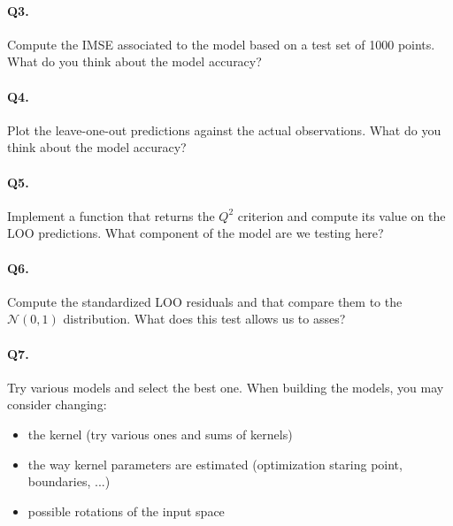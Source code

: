 \documentclass[12pt]{scrartcl}
\begin{document}
\paragraph{Q3.}
Compute the IMSE associated to the model based on a test set of 1000 points. What do you think about the model accuracy?

\paragraph{Q4.}
Plot the leave-one-out predictions against the actual observations. What do you think about the model accuracy?

\paragraph{Q5.}
Implement a function that returns the $Q^2$ criterion and compute its value on the LOO predictions. What component of the model are we testing here?

\paragraph{Q6.}
Compute the standardized LOO residuals and that compare them to the $\mathcal{N}(0,1)$ distribution. What does this test allows us to asses?

\paragraph{Q7.} Try various models and select the best one. When building the models, you may consider changing:
\begin{itemize}
   	\item the kernel (try various ones and sums of kernels)
   	\item the way kernel parameters are estimated (optimization staring point, boundaries, ...)
   	\item possible rotations of the input space
\end{itemize}
\end{document}
